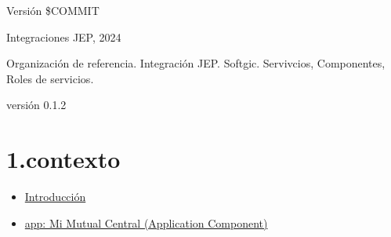 \documentclass[
  paper=a4,
  ,captions=tableheading
]{scrartcl}
\providecommand{\tightlist}{%
  \setlength{\itemsep}{0pt}\setlength{\parskip}{0pt}}
\begin{document}
Versión \$COMMIT

Integraciones JEP, 2024

Organización de referencia. Integración JEP. Softgic. Servivcios,
Componentes, Roles de servicios.

versión 0.1.2

\section{1.contexto}\label{sec:contexto}

\begin{itemize}
\tightlist
\item
  \hyperref[Introducciuxf3n]{Introducción}
\item
  \hyperref[app:-mi-mutual-central-application-component]{app: Mi Mutual
  Central (Application Component)}


\end{itemize}
\end{document}
